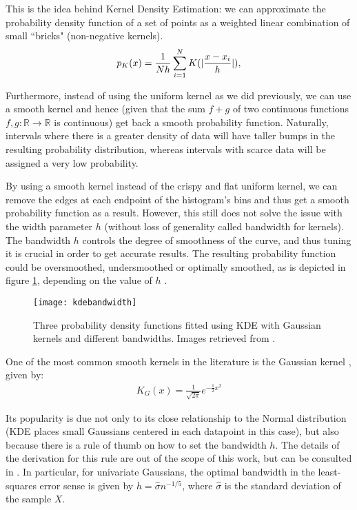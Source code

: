 \documentclass[../main.tex]{subfiles}
\begin{document}
\par This is the idea behind Kernel Density Estimation: we can approximate the probability density function of a set of points as a weighted linear combination of small ``bricks" (non-negative kernels). 
\begin{align*}
p_K(x) = \frac{1}{Nh}\sum_{i=1}^NK(\lvert\frac{x - x_i}{h}\rvert),\\
\end{align*}
\par Furthermore, instead of using the uniform kernel as we did previously, we can use a smooth kernel and hence (given that the sum $f+g$ of two continuous functions $f, g: \mathbb{R} \rightarrow \mathbb{R}$ is continuous) get back a smooth probability function. Naturally, intervals where there is a greater density of data will have taller bumps in the resulting probability distribution, whereas intervals with scarce data will be assigned a very low probability.  
\par By using a smooth kernel instead of the crispy and flat uniform kernel, we can remove the edges at each endpoint of the histogram's bins and thus get a smooth probability function as a result. However, this still does not solve the issue with the width parameter $h$ (without loss of generality called bandwidth for kernels). The bandwidth $h$ controls the degree of smoothness of the curve, and thus tuning it is crucial in order to get accurate results. The resulting probability function could be oversmoothed, undersmoothed or optimally smoothed, as is depicted in figure \ref{fig_kdebandwidths}, depending on the value of $h$ \cite{Duong2004}.
\begin{figure}[t]
\centering
\texttt{[image: kdebandwidth]}
\caption{Three probability density functions fitted using KDE with Gaussian kernels and different bandwidths. Images retrieved from \cite{Duong2004}.}
\label{fig_kdebandwidths}
\end{figure}
\par One of the most common smooth kernels in the literature is the Gaussian kernel \cite{hastie2008}, given by:
\begin{align*}
K_G(x) = \frac{1}{\sqrt{2\pi}}e^{-\frac{1}{2}x^2}
\end{align*}
\par Its popularity is due not only to its close relationship to the Normal distribution (KDE places small Gaussians centered in each datapoint in this case), but also because there is a rule of thumb on how to set the bandwidth $h$. The details of the derivation for this rule are out of the scope of this work, but can be consulted in \cite{Hansen2009}. In particular, for univariate Gaussians, the optimal bandwidth in the least-squares error sense is given by $h = \hat{\sigma}n^{-1/5}$, where $\hat{\sigma}$ is the standard deviation of the sample $X$.
\end{document}
